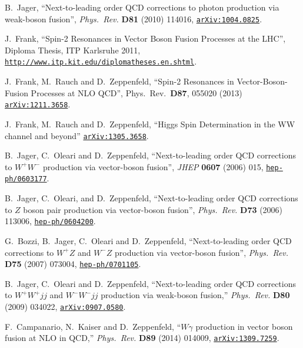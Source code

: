 \documentclass[english,12pt]{article}
\begin{document}
\begin{thebibliography}{10}
  B.~Jager,
  ``Next-to-leading order QCD corrections to photon production via weak-boson
  fusion'',
  {\em Phys.\ Rev.} {\bf D81} (2010) 114016,
 \href{http://arxiv.org/abs/1004.0825}{{\tt arXiv:1004.0825}}. 
  
J.~Frank, ``Spin-2 Resonances in Vector Boson Fusion Processes at the LHC'', 
{Diploma Thesis, ITP Karlsruhe 2011}, 
\href{http://www.itp.kit.edu/diplomatheses.en.shtml}{{\tt http://www.itp.kit.edu/diplomatheses.en.shtml}}.

  J.~Frank, M.~Rauch and D.~Zeppenfeld,
  ``Spin-2 Resonances in Vector-Boson-Fusion Processes at NLO QCD'',
  Phys.\ Rev.\ {\bf D87}, 055020 (2013)
 \href{http://arxiv.org/abs/1211.3658}{{\tt arXiv:1211.3658}}. 
  
  J.~Frank, M.~Rauch and D.~Zeppenfeld,
  ``Higgs Spin Determination in the WW channel and beyond''
 \href{http://arxiv.org/abs/1305.3658}{{\tt arXiv:1305.3658}}. 

B.~Jager, C.~Oleari and D.~Zeppenfeld, ``Next-to-leading order QCD corrections
  to $W^+ W^-$ production via vector-boson fusion'', {\em JHEP} {\bf 0607} 
(2006) 015,
\href{http://www.arXiv.org/abs/hep-ph/0603177}{{\tt hep-ph/0603177}}.

B.~Jager, C.~Oleari, and D.~Zeppenfeld, ``Next-to-leading order QCD corrections
  to $Z$ boson pair production via vector-boson fusion'', {\em Phys.\ Rev.} {\bf
  D73} (2006) 113006,
\href{http://www.arXiv.org/abs/hep-ph/0604200}{{\tt hep-ph/0604200}}.

G.~Bozzi, B.~Jager, C.~Oleari and D.~Zeppenfeld, ``Next-to-leading order QCD
  corrections to $W^+Z$ and $W^-Z$ production via vector-boson 
fusion'', {\em Phys.\ Rev.} {\bf D75} (2007) 073004,
\href{http://www.arXiv.org/abs/hep-ph/0701105}{{\tt hep-ph/0701105}}.

  B.~Jager, C.~Oleari and D.~Zeppenfeld,
  ``Next-to-leading order QCD corrections to $W^+ W^+ jj$ and $W^- W^- jj$ production via weak-boson fusion,''
  {\em Phys.\ Rev.} {\bf D80} (2009) 034022,
\href{http://arxiv.org/abs/0907.0580}{{\tt arXiv:0907.0580}}.

  F.~Campanario, N.~Kaiser and D.~Zeppenfeld,
  ``$W \gamma$ production in vector boson fusion at NLO in QCD,''
  {\em Phys.\ Rev.} {\bf D89} (2014) 014009,
\href{http://arxiv.org/abs/1309.7259}{{\tt arXiv:1309.7259}}.


\end{thebibliography}
\end{document}
